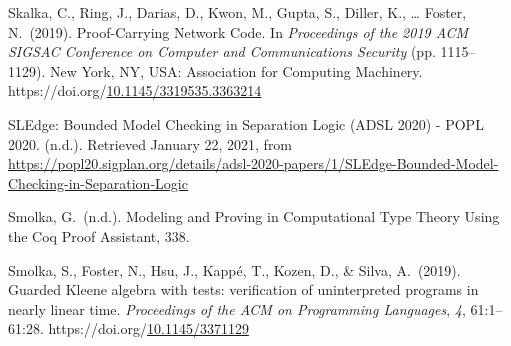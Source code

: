 \documentclass[12pt,twoside]{article}
\begin{document}
{\begin{thebibliography}{1079}
\mdbibitemlabel{}Skalka, C., Ring, J., Darias, D., Kwon, M., Gupta, S., Diller, K., … Foster, N.~(2019). Proof-Carrying Network Code. In \emph{Proceedings of the 2019 ACM SIGSAC Conference on Computer and Communications Security} (pp. 1115–1129). New York, NY, USA: Association for Computing Machinery. https://doi.org/\href{https://dx.doi.org/10.1145/3319535.3363214}{10.1145/3319535.3363214}%

\mdbibitemlabel{}SLEdge: Bounded Model Checking in Separation Logic (ADSL 2020) - POPL 2020. (n.d.). Retrieved January 22, 2021, from \href{https://popl20.sigplan.org/details/adsl-2020-papers/1/SLEdge-Bounded-Model-Checking-in-Separation-Logic}{{\ttfamily https://\hspace{0pt}popl20.\hspace{0pt}sigplan.\hspace{0pt}org/\hspace{0pt}details/\hspace{0pt}adsl-\hspace{0pt}2020-\hspace{0pt}papers/\hspace{0pt}1/\hspace{0pt}SLEdge-\hspace{0pt}Bounded-\hspace{0pt}Model-\hspace{0pt}Checking-\hspace{0pt}in-\hspace{0pt}Separation-\hspace{0pt}Logic}}%

\mdbibitemlabel{}Smolka, G.~(n.d.). Modeling and Proving in Computational Type Theory Using the Coq Proof Assistant, 338.%

\mdbibitemlabel{}Smolka, S., Foster, N., Hsu, J., Kappé, T., Kozen, D., \& Silva, A.~(2019). Guarded Kleene algebra with tests: verification of uninterpreted programs in nearly linear time. \emph{Proceedings of the ACM on Programming Languages}, \emph{4}, 61:1–61:28. https://doi.org/\href{https://dx.doi.org/10.1145/3371129}{10.1145/3371129}%


\end{thebibliography}}
\end{document}
